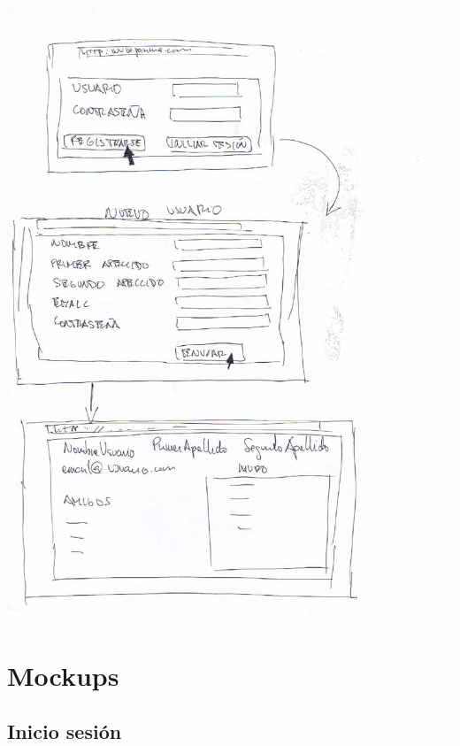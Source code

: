 \documentclass[12pt, a4paper, titlepage]{article}
\begin{document}
	\begin{center}
		\includegraphics[scale=0.5]{Imagenes/registrarse}
	\end{center}

\clearpage
\section{Mockups}

\subsection{Inicio sesión}
\end{document}
